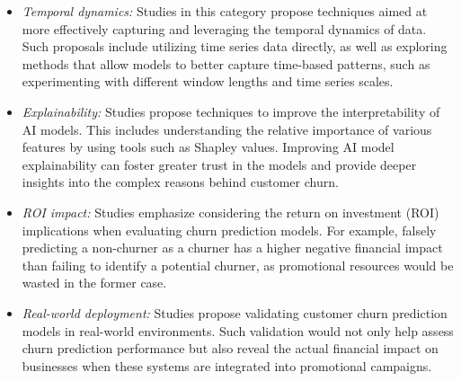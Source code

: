 \begin{itemize}
    \item \textit{Temporal dynamics:} Studies in this category propose techniques aimed at more effectively capturing and leveraging the temporal dynamics of data. Such proposals include utilizing time series data directly, as well as exploring methods that allow models to better capture time-based patterns, such as experimenting with different window lengths and time series scales.
    

    \item \textit{Explainability:} Studies propose techniques to improve the interpretability of AI models. This includes understanding the relative importance of various features by using tools such as Shapley values. Improving AI model explainability can foster greater trust in the models and provide deeper insights into the complex reasons behind customer churn.

    \item \textit{ROI impact:} Studies emphasize considering the return on investment (ROI) implications when evaluating churn prediction models. For example, falsely predicting a non-churner as a churner has a higher negative financial impact than failing to identify a potential churner, as promotional resources would be wasted in the former case.
    
    \item \textit{Real-world deployment:} Studies propose validating customer churn prediction models in real-world environments. Such validation would not only help assess churn prediction performance but also reveal the actual financial impact on businesses when these systems are integrated into promotional campaigns.
    
\end{itemize}



